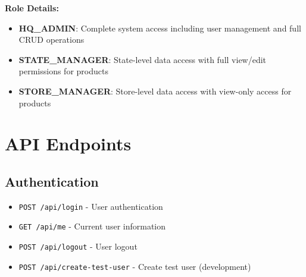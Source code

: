 \documentclass[11pt,a4paper]{article}
\begin{document}
\textbf{Role Details:}
\begin{itemize}[leftmargin=1cm]
    \item \textbf{HQ\_ADMIN}: Complete system access including user management and full CRUD operations
    \item \textbf{STATE\_MANAGER}: State-level data access with full view/edit permissions for products
    \item \textbf{STORE\_MANAGER}: Store-level data access with view-only access for products
\end{itemize}

\section{API Endpoints}

\subsection{Authentication}
\begin{itemize}[leftmargin=*]
    \item \texttt{POST /api/login} - User authentication
    \item \texttt{GET /api/me} - Current user information
    \item \texttt{POST /api/logout} - User logout
    \item \texttt{POST /api/create-test-user} - Create test user (development)
\end{itemize}
\end{document}
